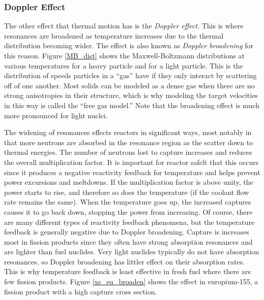 \subsubsection{Doppler Effect}


The other effect that thermal motion has is the \emph{Doppler effect}.  This is where resonances are broadened as temperature increases due to the thermal distribution becoming wider.  The effect is also known as \emph{Doppler broadening} for this reason.  Figure \ref{MB_dist} shows the Maxwell-Boltzmann distributions at various temperatures for a heavy particle and for a light particle.  This is the distribution of speeds particles in a ``gas'' have if they only interact by scattering off of one another.  Most solids can be modeled as a dense gas when there are no strong anisotropies in their structure, which is why modeling the target velocities in this way is called the ``free gas model.''  Note that the broadening effect is much more pronounced for light nuclei.  

The widening of resonances effects reactors in significant ways, most notably in that more neutrons are absorbed in the resonance region as the scatter down to thermal energies.  The number of neutrons lost to capture increases and reduces the overall multiplication factor.  It is important for reactor safelt that this occurs since it produces a negative reactivity feedback for temperature and helps prevent power excursions and meltdowns.  If the multiplication factor is above unity, the power starts to rise, and therefore so does the temperature (if the coolant flow rate remains the same).  When the temperature goes up, the increased captures causes it to go back down, stopping the power from increasing.  Of course, there are many different types of reactivity feedback phenomena, but the temperature feedback is generally negative due to Doppler broadening.  Capture is increases most in fission products since they often have strong absorption resonances and are lighter than fuel nuclides.  Very light nuclides typically do not have absorption resonances, so Doppler broadening has littler effect on their absorption rates.  This is why temperature feedback is least effective in fresh fuel where there are few fission products.  Figure \ref{xs_eu_broaden} shows the effect in europium-155, a fission product with a high capture cross section.

